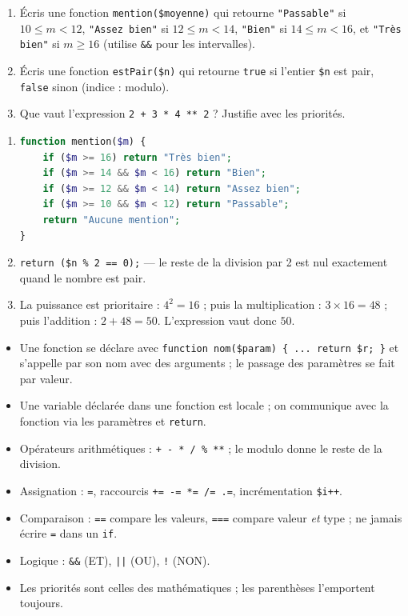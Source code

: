 \documentclass[11pt]{article}
\begin{document}
\begin{exercice}
\begin{enumerate}
    \item Écris une fonction \texttt{mention(\$moyenne)} qui retourne \texttt{"Passable"} si $10 \leq m < 12$, \texttt{"Assez bien"} si $12 \leq m < 14$, \texttt{"Bien"} si $14 \leq m < 16$, et \texttt{"Très bien"} si $m \geq 16$ (utilise \texttt{\&\&} pour les intervalles).
    \item Écris une fonction \texttt{estPair(\$n)} qui retourne \texttt{true} si l'entier \texttt{\$n} est pair, \texttt{false} sinon (indice : modulo).
    \item Que vaut l'expression \texttt{2 + 3 * 4 *{}* 2} ? Justifie avec les priorités.
\end{enumerate}
\end{exercice}

\begin{corrige}[Exercice]
\begin{enumerate}
    \item 
\begin{lstlisting}[language=Php]
function mention($m) {
    if ($m >= 16) return "Très bien";
    if ($m >= 14 && $m < 16) return "Bien";
    if ($m >= 12 && $m < 14) return "Assez bien";
    if ($m >= 10 && $m < 12) return "Passable";
    return "Aucune mention";
}
\end{lstlisting}
    \item \texttt{return (\$n \% 2 == 0);} — le reste de la division par 2 est nul exactement quand le nombre est pair.
    \item La puissance est prioritaire : $4^2 = 16$ ; puis la multiplication : $3 \times 16 = 48$ ; puis l'addition : $2 + 48 = 50$. L'expression vaut donc $50$.
\end{enumerate}
\end{corrige}

\begin{aretenir}
\begin{itemize}
    \item Une fonction se déclare avec \texttt{function nom(\$param) \{ ... return \$r; \}} et s'appelle par son nom avec des arguments ; le passage des paramètres se fait par valeur.
    \item Une variable déclarée dans une fonction est locale ; on communique avec la fonction via les paramètres et \texttt{return}.
    \item Opérateurs arithmétiques : \texttt{+ - * / \% *{}*} ; le modulo donne le reste de la division.
    \item Assignation : \texttt{=}, raccourcis \texttt{+= -= *= /= .=}, incrémentation \texttt{\$i++}.
    \item Comparaison : \texttt{==} compare les valeurs, \texttt{===} compare valeur \emph{et} type ; ne jamais écrire \texttt{=} dans un \texttt{if}.
    \item Logique : \texttt{\&\&} (ET), \texttt{||} (OU), \texttt{!} (NON).
    \item Les priorités sont celles des mathématiques ; les parenthèses l'emportent toujours.
\end{itemize}
\end{aretenir}
\end{document}
